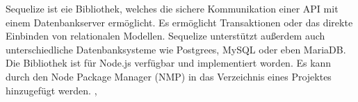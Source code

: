 
Sequelize ist eie Bibliothek, welches die sichere Kommunikation einer API mit einem Datenbankserver ermöglicht. Es ermöglicht Transaktionen oder das direkte Einbinden von relationalen Modellen. Sequelize unterstützt außerdem auch unterschiedliche Datenbanksysteme wie Postgrees, MySQL oder eben MariaDB. Die Bibliothek ist für Node.js verfügbar und implementiert worden. Es kann durch den Node Package Manager (NMP) in das Verzeichnis eines Projektes hinzugefügt werden. \cite{Sequelize}, \cite{SequInstall}